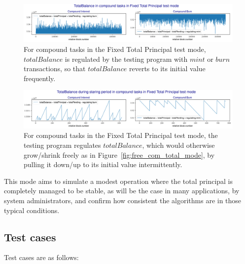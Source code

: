 \documentclass{article}
\begin{document}
\begin{itemize}
  \begin{figure}[H]
    \centering
    \includegraphics[width=5.3in]{images/_6.3_fixed_com_total_balance.jpg}
    \caption{For compound tasks in the Fixed Total Principal test mode, 
    $totalBalance$  
    is regulated by the testing program with $mint$ or $burn$ transactions, 
    so that $totalBalance$ reverts to its initial value frequently.
    }
    \label{fig:fixed_com_total_mode}
  \end{figure}

  \begin{figure}[H]
    \centering
    \includegraphics[width=5.3in]{images/_6.3_fixed_com_total_balance_start.jpg}
    \caption{For compound tasks in the Fixed Total Principal test mode, 
    the testing program regulates $totalBalance$, which would otherwise 
    grow/shrink freely as in Figure~\ref{fig:free_com_total_mode}, 
    by pulling it down/up to its initial value intermittently.
    }
    \label{fig:fixed_com_total_start_mode}
  \end{figure}

  This mode aims to simulate a modest operation where the total principal 
  is completely managed to be stable, as will be the case in many applications, 
  by system administrators, and confirm how consistent the algorithms 
  are in those typical conditions.

\end{itemize}

\subsection{Test cases}
\label{sec:TestCases}

Test cases are as follows:
\newline
\end{document}
